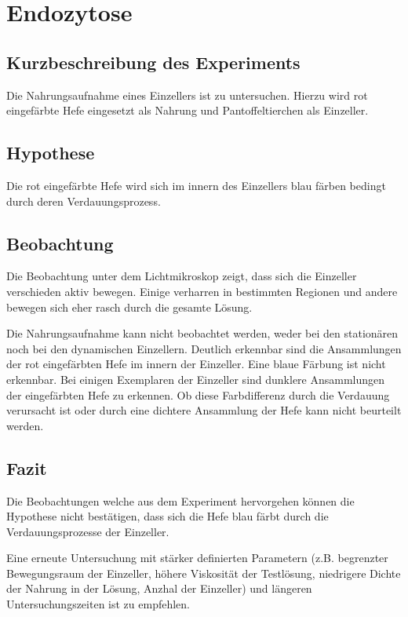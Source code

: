 \section{Endozytose}

\subsection{Kurzbeschreibung des Experiments}
Die Nahrungsaufnahme eines Einzellers ist zu untersuchen.
Hierzu wird rot eingefärbte Hefe eingesetzt als Nahrung und Pantoffeltierchen
als Einzeller.

\subsection{Hypothese}
Die rot eingefärbte Hefe wird sich im innern des Einzellers blau färben
bedingt durch deren Verdauungsprozess.

\subsection{Beobachtung}
Die Beobachtung unter dem Lichtmikroskop zeigt, dass sich die Einzeller
verschieden aktiv bewegen. Einige verharren in bestimmten Regionen und
andere bewegen sich eher rasch durch die gesamte Lösung. 

Die Nahrungsaufnahme kann nicht beobachtet werden, weder bei den stationären
noch bei den dynamischen Einzellern. Deutlich erkennbar sind die Ansammlungen
der rot eingefärbten Hefe im innern der Einzeller. Eine blaue Färbung ist nicht
erkennbar. Bei einigen Exemplaren der Einzeller sind dunklere Ansammlungen
der eingefärbten Hefe zu erkennen. Ob diese Farbdifferenz durch die Verdauung
verursacht ist oder durch eine dichtere Ansammlung der Hefe kann nicht
beurteilt werden.

\subsection{Fazit}
Die Beobachtungen welche aus dem Experiment hervorgehen können die Hypothese
nicht bestätigen, dass sich die Hefe blau färbt durch die Verdauungsprozesse
der Einzeller.

Eine erneute Untersuchung mit stärker definierten Parametern
(z.B. begrenzter Bewegungsraum der Einzeller, höhere Viskosität der
Testlösung, niedrigere Dichte der Nahrung in der Lösung, Anzhal der Einzeller)
und längeren Untersuchungszeiten ist zu empfehlen.
